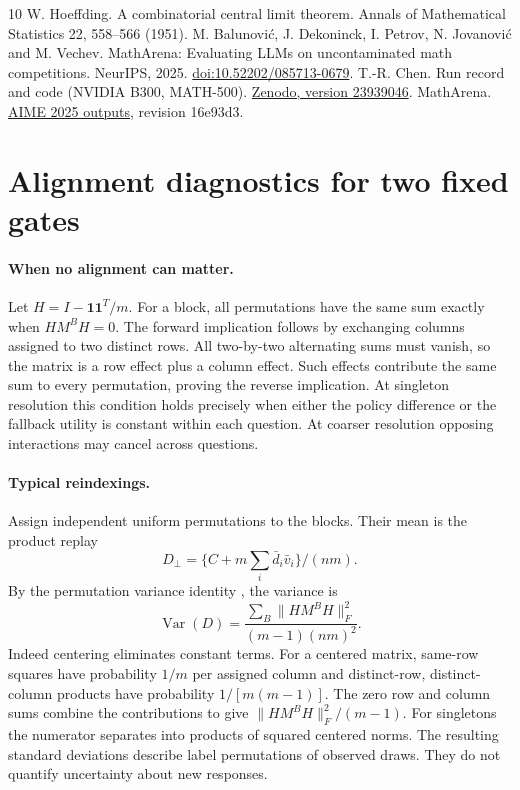 \documentclass[11pt]{article}
\newcommand{\Var}{\operatorname{Var}}
\begin{document}
\begin{thebibliography}{10}
 W. Hoeffding. A combinatorial central limit theorem. Annals of Mathematical Statistics 22, 558--566 (1951).
 M. Balunovi\'c, J. Dekoninck, I. Petrov, N. Jovanovi\'c and M. Vechev. MathArena: Evaluating LLMs on uncontaminated math competitions. NeurIPS, 2025. \href{https://doi.org/10.52202/085713-0679}{doi:10.52202/085713-0679}.
 T.-R. Chen. Run record and code (NVIDIA B300, MATH-500). \href{https://doi.org/10.5281/zenodo.23939046}{Zenodo, version 23939046}.
 MathArena. \href{https://huggingface.co/datasets/MathArena/aime_2025_outputs/tree/16e93d3bb9b0a25ea9422893464d46b3c5ff0ae9}{AIME 2025 outputs}, revision 16e93d3.
\end{thebibliography}
\endgroup
\clearpage
\appendix
\section{Alignment diagnostics for two fixed gates}
\paragraph{When no alignment can matter.} Let $H=I-\boldsymbol 1\boldsymbol 1^T/m$. For a block, all permutations have the same sum exactly when $HM^BH=0$. The forward implication follows by exchanging columns assigned to two distinct rows. All two-by-two alternating sums must vanish, so the matrix is a row effect plus a column effect. Such effects contribute the same sum to every permutation, proving the reverse implication. At singleton resolution this condition holds precisely when either the policy difference or the fallback utility is constant within each question. At coarser resolution opposing interactions may cancel across questions.

\paragraph{Typical reindexings.} Assign independent uniform permutations to the blocks. Their mean is the product replay
\[
 D_\perp=\{C+m\sum_i\bar d_i\bar v_i\}/(nm).
\]
By the permutation variance identity \cite{hoeffding}, the variance is
\begin{equation}
 \Var(D)=\frac{\sum_B\|HM^BH\|_F^2}{(m-1)(nm)^2}. \label{eq:var}
\end{equation}
Indeed centering eliminates constant terms. For a centered matrix, same-row squares have probability $1/m$ per assigned column and distinct-row, distinct-column products have probability $1/[m(m-1)]$. The zero row and column sums combine the contributions to give $\|HM^BH\|_F^2/(m-1)$. For singletons the numerator separates into products of squared centered norms. The resulting standard deviations describe label permutations of observed draws. They do not quantify uncertainty about new responses.
\end{document}
